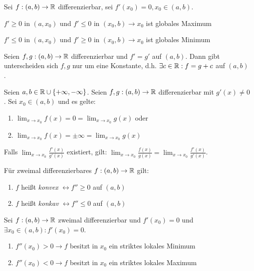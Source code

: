 \begin{satz}
	Sei $f : (a,b) \rightarrow \mathbb{R}$ differenzierbar, sei $f'(x_0) = 0, x_0 \in (a,b)$.
	\begin{description}[noitemsep]
		\item $f' \geq 0$ in $(a, x_0)$ und $f' \leq 0$ in $(x_0, b) \rightarrow x_0$ ist globales Maximum
		\item $f' \leq 0$ in $(a, x_0)$ und $f' \geq 0$ in $(x_0, b) \rightarrow x_0$ ist globales Minimum
	\end{description}
\end{satz}

\begin{satz}
	Seien $f,g : (a,b) \rightarrow \mathbb{R}$ differenzierbar und $f' = g'$ auf $(a,b)$. Dann gibt unterscheiden sich $f,g$ nur um eine Konstante, d.h. $\exists c \in \mathbb{R} : f = g + c$ auf $(a,b)$.
\end{satz}

\begin{satz}[L'Hospital]
	Seien $a,b \in \mathbb{R} \cup \{+ \infty, - \infty\}$. Seien $f, g : (a,b) \rightarrow \mathbb{R}$ differenzierbar mit $g'(x) \neq 0$. Sei $x_0 \in (a,b)$ und es gelte:
	\begin{enumerate}[noitemsep]
		\item $\lim_{x \rightarrow x_0} f(x) = 0 = \lim_{x \rightarrow x_0} g(x)$ oder
		\item$\lim_{x \rightarrow x_0} f(x) = \pm \infty = \lim_{x \rightarrow x_0} g(x)$
	\end{enumerate}
	Falls $\lim_{x \rightarrow x_0} \frac{f'(x)}{g'(x)}$ existiert, gilt: $\lim_{x \rightarrow x_0} \frac{f(x)}{g(x)} = \lim_{x \rightarrow x_0} \frac{f'(x)}{g'(x)}$.
\end{satz}

\begin{definition}
	Für zweimal differenzierbares $f : (a,b) \rightarrow \mathbb{R}$ gilt:
	\begin{enumerate}[noitemsep]
		\item $f$ heißt \emph{konvex} $\leftrightarrow f'' \geq 0$ auf $(a,b)$
		\item $f$ heißt \emph{konkav} $\leftrightarrow f'' \leq 0$ auf $(a,b)$		
	\end{enumerate}
\end{definition}

\begin{satz}
	Sei $f : (a,b) \rightarrow \mathbb{R}$ zweimal differenzierbar und $f'(x_0)=0$ und $\exists x_0 \in (a,b) : f'(x_0) = 0$.
	
	\begin{enumerate}[noitemsep]
		\item $f''(x_0) > 0 \rightarrow f$ besitzt in $x_0$ ein striktes lokales Minimum
		\item $f''(x_0) < 0 \rightarrow f$ besitzt in $x_0$ ein striktes lokales Maximum	
	\end{enumerate}
\end{satz}

